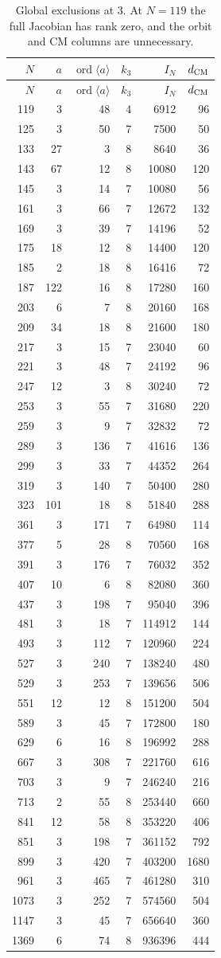 \begin{longtable}{r|r|r|r|r|r}
\caption{Global exclusions at $3$. At $N=119$ the full Jacobian has rank
zero, and the orbit and CM columns are unnecessary.}\label{tab:global3}\\
$N$&$a$&$\operatorname{ord}\langle a\rangle$&$k_3$&$I_N$&$d_{\rm CM}$\\\hline
\endfirsthead
$N$&$a$&$\operatorname{ord}\langle a\rangle$&$k_3$&$I_N$&$d_{\rm CM}$\\\hline
\endhead
119&3&48&4&6912&96\\
125&3&50&7&7500&50\\
133&27&3&8&8640&36\\
143&67&12&8&10080&120\\
145&3&14&7&10080&56\\
161&3&66&7&12672&132\\
169&3&39&7&14196&52\\
175&18&12&8&14400&120\\
185&2&18&8&16416&72\\
187&122&16&8&17280&160\\
203&6&7&8&20160&168\\
209&34&18&8&21600&180\\
217&3&15&7&23040&60\\
221&3&48&7&24192&96\\
247&12&3&8&30240&72\\
253&3&55&7&31680&220\\
259&3&9&7&32832&72\\
289&3&136&7&41616&136\\
299&3&33&7&44352&264\\
319&3&140&7&50400&280\\
323&101&18&8&51840&288\\
361&3&171&7&64980&114\\
377&5&28&8&70560&168\\
391&3&176&7&76032&352\\
407&10&6&8&82080&360\\
437&3&198&7&95040&396\\
481&3&18&7&114912&144\\
493&3&112&7&120960&224\\
527&3&240&7&138240&480\\
529&3&253&7&139656&506\\
551&12&12&8&151200&504\\
589&3&45&7&172800&180\\
629&6&16&8&196992&288\\
667&3&308&7&221760&616\\
703&3&9&7&246240&216\\
713&2&55&8&253440&660\\
841&12&58&8&353220&406\\
851&3&198&7&361152&792\\
899&3&420&7&403200&1680\\
961&3&465&7&461280&310\\
1073&3&252&7&574560&504\\
1147&3&45&7&656640&360\\
1369&6&74&8&936396&444\\
\end{longtable}
